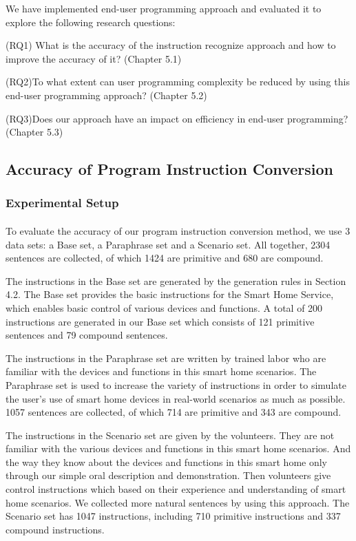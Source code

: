 
We have implemented end-user programming approach and evaluated it to explore the following research questions:

(RQ1) What is the accuracy of the instruction recognize approach and how to improve the accuracy of it? (Chapter 5.1)

(RQ2)To what extent can user programming complexity be reduced by using this end-user programming approach? (Chapter 5.2)

(RQ3)Does our approach have an impact on efficiency in end-user programming? (Chapter 5.3)

\subsection{Accuracy of Program Instruction Conversion}

\subsubsection{Experimental Setup}

\paragraph{}
To evaluate the accuracy of our program instruction conversion method, we use 3 data sets: a Base set, a Paraphrase set and a Scenario set. All together, 2304 sentences are collected, of which 1424 are primitive and 680 are compound.

The instructions in the Base set are generated by the generation rules in Section 4.2. The Base set provides the basic instructions for the Smart Home Service, which enables basic control of various devices and functions. A total of 200 instructions are generated in our Base set which consists of 121 primitive sentences and 79 compound sentences.

The instructions in the Paraphrase set are written by trained labor who are familiar with the devices and functions in this smart home scenarios. The Paraphrase set is used to increase the variety of instructions in order to simulate the user's use of smart home devices in real-world scenarios as much as possible. 1057 sentences are collected, of which 714 are primitive and 343 are compound.

The instructions in the Scenario set are given by the volunteers. They are not familiar with the various devices and functions in this smart home scenarios. And the way they know about the devices and functions in this smart home only through our simple oral description and demonstration. Then volunteers give control instructions which based on their experience and understanding of smart home scenarios. We collected more natural sentences by using this approach. The Scenario set has 1047 instructions, including 710 primitive instructions and 337 compound instructions.

